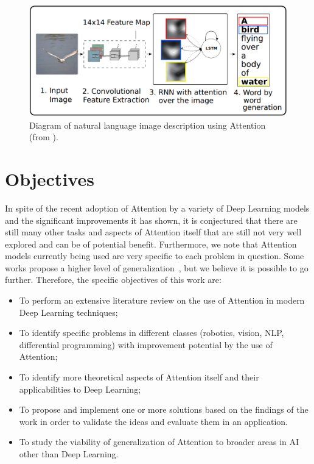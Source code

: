 \documentclass[English]{style/ic-tese-v3}
\begin{document}
\begin{figure}
\begin{center}
	\includegraphics[width=1.0\linewidth]{./img/img_captioning.png}
\caption{
    Diagram of natural language image description using Attention
    (from \cite{ref:img-captioning}).
}
\label{fig:description}
\end{center}
\end{figure}

\section{Objectives}
In spite of the recent adoption of Attention by a variety of Deep Learning models
and the significant improvements it has shown, it is conjectured that there are still many other tasks
and aspects of Attention itself that are still not very well explored and can be of potential benefit.
Furthermore, we note that Attention models currently being used
are very specific to each problem in question.
Some works propose a higher level of generalization~\cite{ref:recurr-models},
but we believe it is possible to go further.
Therefore, the specific objectives of this work are:
\begin{itemize}
    \item To perform an extensive literature review on the use of Attention
        in modern Deep Learning techniques;
    \item To identify specific problems in different classes
        (robotics, vision, NLP, differential programming) with
        improvement potential by the use of Attention;
    \item To identify more theoretical aspects of Attention itself and their applicabilities to Deep Learning;
    \item To propose and implement one or more solutions based on the findings of the work in order to
        validate the ideas and evaluate them in an application.
    \item To study the viability of generalization of Attention
        to broader areas in AI other than Deep Learning.
\end{itemize}
\end{document}
